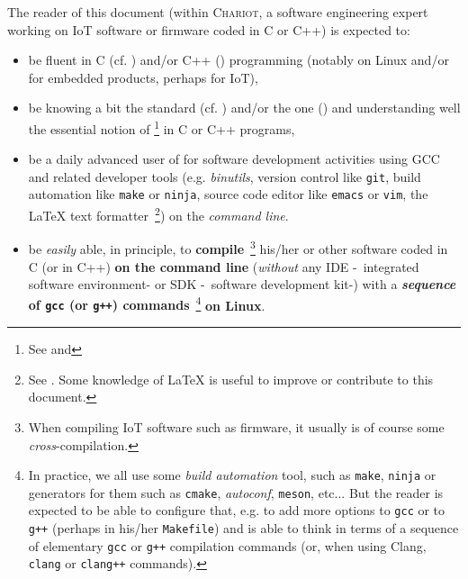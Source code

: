 \bigskip

The reader of this document (within \textsc{Chariot}, a software
engineering expert working on IoT software or firmware coded in C or
C++) is expected to:

\begin{itemize}

  \item be fluent in C (cf. \cite{Kernighan:1988:CPL}) and/or C++
    (\cite{Stroustrup:2014:CplusPlus}) programming (notably on Linux
    and/or for embedded products, perhaps for IoT),

  \item be knowing a bit the  standard
    (cf. \cite{C11:std,Memarian:2016:PLDI}) and/or the
     one (\cite{CplusPlus11:std}) and
    understanding well the essential notion of  \footnote{See
      and } in C or C++
    programs,

  \item be a daily advanced user of  for software
    development activities using GCC and related developer tools
    (e.g. \textit{binutils}, version control like \texttt{git}, build
    automation like \texttt{make} or \texttt{ninja}, source code
    editor like \texttt{emacs} or \texttt{vim}, the {\LaTeX} text
    formatter~\footnote{See
      . Some knowledge of
            {\LaTeX} is useful to improve or contribute to this
            document.}) on the \emph{command line}.
    
    \item be \emph{easily} able, in principle, to
      \textbf{compile}~\footnote{When compiling IoT software such as
        firmware, it usually is of course some
        \emph{cross}-compilation.}  his/her or other software coded in
      C (or in C++) \textbf{on the command line} (\emph{without} any
      IDE
      -~integrated software
      environment- or  SDK
      -~software development kit-)
      with a \textbf{\emph{sequence} of \texttt{gcc} (or \texttt{g++})
        commands}~\footnote{In practice, we all use some \emph{build
          automation} tool, such as \texttt{make}, \texttt{ninja} or
        generators for them such as \texttt{cmake}, \emph{autoconf},
        \texttt{meson}, etc... But the reader is expected to be able
        to configure that, e.g. to add more options to \texttt{gcc} or
        to \texttt{g++} (perhaps in his/her \texttt{Makefile}) and is
        able to think in terms of a sequence of elementary
        \texttt{gcc} or \texttt{g++} compilation commands (or, when
        using Clang, \texttt{clang} or \texttt{clang++} commands).}
      \textbf{on Linux}.




\end{itemize}
